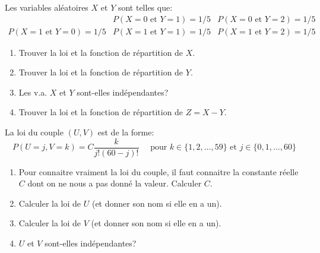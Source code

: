 \documentclass[a4paper,12pt,reqno]{amsart}
\begin{document}


\begin{exo}

  Les variables aléatoires $X$ et $Y$ sont telles que:
    $$
      \begin{array}{ccc}
                                   & P(X=0 \text{ et } Y=1)=1/5 & P(X=0 \text{ et } Y=2)=1/5 \\
        P(X=1 \text{ et } Y=0)=1/5 & P(X=1 \text{ et } Y=1)=1/5 & P(X=1 \text{ et } Y=2)=1/5
      \end{array}
    $$
  \begin{enumerate}
    \item Trouver la loi et la fonction de répartition de $X$.
    \item Trouver la loi et la fonction de répartition de $Y$.
    \item Les v.a. $X$ et $Y$ sont-elles indépendantes?
    \item Trouver la loi et la fonction de répartition de $Z = X-Y$.
  \end{enumerate}

\end{exo}

\begin{exo}

  La loi du couple $(U,V)$ est de la forme:
    $$
      P(U=j,V=k)=C\frac{k}{j!(60-j)!} \quad\text{ pour } k\in\{1,2,\ldots,59\} \text{ et } j\in\{0,1,\ldots,60\}
    $$
  \begin{enumerate}
    \item Pour connaitre vraiment la loi du couple, il faut connaitre la constante réelle $C$ dont on ne nous a pas donné la valeur. Calculer $C$.
    \item Calculer la loi de $U$ (et donner son nom si elle en a un).
    \item Calculer la loi de $V$ (et donner son nom si elle en a un).
    \item $U$ et $V$ sont-elles indépendantes?
  \end{enumerate}

\end{exo}
\end{document}
